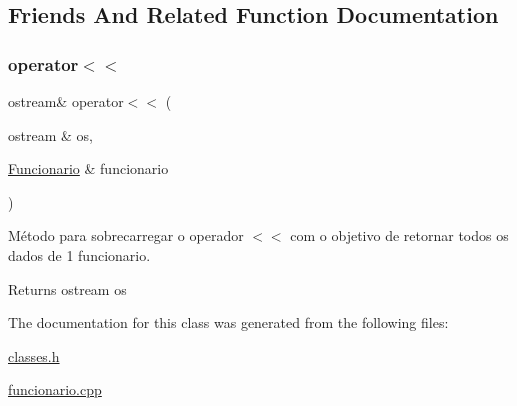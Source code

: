 \subsection{Friends And Related Function Documentation}
\mbox{\label{classFuncionario_a915f81100b5fd32446de7308951b0fc3}} 
\subsubsection{\texorpdfstring{operator$<$$<$}{operator<<}}
{\footnotesize\ttfamily ostream\& operator$<$$<$ (\begin{DoxyParamCaption}\item[{ostream \&}]{os,  }\item[{\hyperlink{classFuncionario}{Funcionario} \&}]{funcionario }\end{DoxyParamCaption})\hspace{0.3cm}{\ttfamily [friend]}}



Método para sobrecarregar o operador $<$$<$ com o objetivo de retornar todos os dados de 1 funcionario. 

\begin{DoxyReturn}{Returns}
ostream os 
\end{DoxyReturn}


The documentation for this class was generated from the following files\+:\begin{DoxyCompactItemize}
\item 
\hyperlink{classes_8h}{classes.\+h}\item 
\hyperlink{funcionario_8cpp}{funcionario.\+cpp}\end{DoxyCompactItemize}
